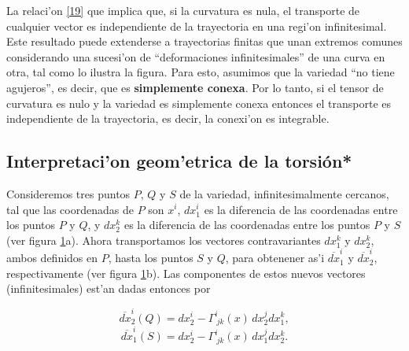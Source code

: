 La relaci'on \eqref{19} que implica que, si la curvatura es nula, el transporte de cualquier vector es independiente de la trayectoria en una regi'on infinitesimal. Este resultado puede extenderse a trayectorias finitas que unan extremos comunes considerando una sucesi'on de ``deformaciones infinitesimales'' de una curva en otra, tal como lo ilustra la figura. Para esto, asumimos que la variedad ``no tiene agujeros'', es decir, que es \textbf{simplemente conexa}. Por lo tanto, si el tensor de curvatura es nulo y la variedad es simplemente conexa entonces el transporte es independiente de la trayectoria, es decir, la conexi'on es integrable.

\subsection{Interpretaci'on geom'etrica de la torsi\'on*}
Consideremos tres puntos $P$, $Q$ y $S$ de la variedad, infinitesimalmente
cercanos, tal que las coordenadas de $P$ son $x^i $, $dx_1^i $ es la
diferencia de las coordenadas entre los puntos $P$ y $Q$, y $dx_2^k $ es la
diferencia de las coordenadas entre los puntos $P$ y $S$ (ver figura \ref{fig:torsion}a). 
Ahora transportamos los vectores contravariantes $dx_1^k $ y $dx_2^k $, ambos definidos en $P$, hasta los puntos $S$ y $Q$, para obtenener as'i $\overline{dx}^i_1$ y $\overline{dx}^i_2$, respectivamente (ver figura \ref{fig:torsion}b). Las componentes de estos nuevos vectores (infinitesimales) est'an dadas entonces por
\begin{center}
\begin{figure}[H]
\centerline{
\hspace{1cm}}
\caption{}
\label{fig:torsion}
\end{figure}
\end{center}
\begin{equation}
\overline{dx}_2^i (Q)=dx_2^i -\Gamma_{\ jk}^i(x)\, dx_2^j dx_1^k ,
\end{equation}
\begin{equation}
\overline{dx}_1^i (S)=dx_2^i -\Gamma_{\ jk}^i(x)\, dx_1^j dx_2^k .
\end{equation}

